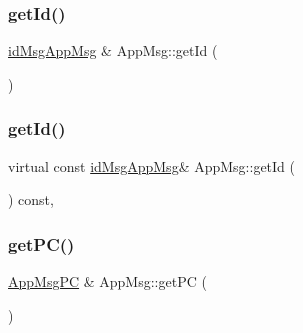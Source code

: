 \mbox{\label{class_app_msg_abd9e4fa4ce0b074123b4e0cf64f5d743}} 
\subsubsection{\texorpdfstring{get\+Id()}{getId()}\hspace{0.1cm}{\footnotesize\ttfamily [1/2]}}
{\footnotesize\ttfamily \hyperlink{_app_msg__m_8h_a0bd5e3a5ba85ac1fa0fd0fae34d903c1}{id\+Msg\+App\+Msg} \& App\+Msg\+::get\+Id (\begin{DoxyParamCaption}{ }\end{DoxyParamCaption})\hspace{0.3cm}{\ttfamily [virtual]}}

\mbox{\label{class_app_msg_a0a87f5d332044dcd5ce861f6bcfaf6b2}} 
\subsubsection{\texorpdfstring{get\+Id()}{getId()}\hspace{0.1cm}{\footnotesize\ttfamily [2/2]}}
{\footnotesize\ttfamily virtual const \hyperlink{_app_msg__m_8h_a0bd5e3a5ba85ac1fa0fd0fae34d903c1}{id\+Msg\+App\+Msg}\& App\+Msg\+::get\+Id (\begin{DoxyParamCaption}{ }\end{DoxyParamCaption}) const\hspace{0.3cm}{\ttfamily [inline]}, {\ttfamily [virtual]}}

\mbox{\label{class_app_msg_a50acdb9331a812120c945612e81cd04f}} 
\subsubsection{\texorpdfstring{get\+P\+C()}{getPC()}\hspace{0.1cm}{\footnotesize\ttfamily [1/2]}}
{\footnotesize\ttfamily \hyperlink{_app_msg__m_8h_abcd76636e4b750d033ffc348601dd7a2}{App\+Msg\+PC} \& App\+Msg\+::get\+PC (\begin{DoxyParamCaption}{ }\end{DoxyParamCaption})\hspace{0.3cm}{\ttfamily [virtual]}}

